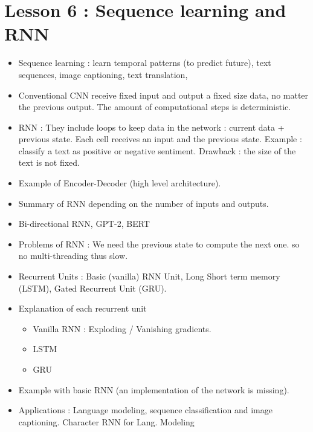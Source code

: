 \documentclass[12pt,a4paper]{article}
\begin{document}
\section*{Lesson 6 : Sequence learning and RNN}
\begin{itemize}
    \item Sequence learning : learn temporal patterns (to predict future), text sequences, image captioning,
    text translation, 
    
    \item Conventional CNN receive fixed input and output a fixed size data, no matter the
    previous output. The amount of computational steps is deterministic.
    
    \item RNN : They include loops to keep data in the network : current data + previous state. Each cell
    receives an input and the previous state.  Example : classify a text as positive or negative
    sentiment. Drawback : the size of the text is not fixed.
    
    \item Example of Encoder-Decoder (high level architecture).
    
    \item Summary of RNN depending on the number of inputs and outputs.
    
    \item Bi-directional RNN, GPT-2, BERT
    
    \item Problems of RNN : We need the previous state to compute the next one. so no multi-threading thus slow.
    
    \item Recurrent Units : Basic (vanilla) RNN Unit, Long Short term memory (LSTM), Gated
    Recurrent Unit (GRU).
    
    \item Explanation of each recurrent unit
        \begin{itemize}
            \item Vanilla RNN : Exploding / Vanishing gradients.
            \item LSTM
            \item GRU
        \end{itemize} 
    
    \item Example with basic RNN (an implementation of the network is missing).
    
    \item Applications : Language modeling, sequence classification and image captioning.
    Character RNN for Lang. Modeling
\end{itemize}
\end{document}
